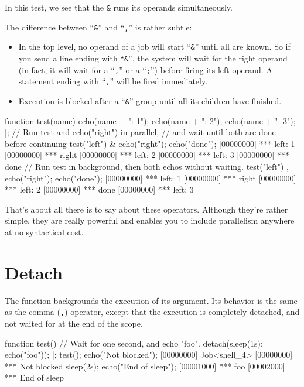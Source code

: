 In this test, we see that the \lstinline{&} runs its operands
simultaneously.

The difference between ``\lstinline{&}'' and ``\lstinline{,}'' is
rather subtle:

\begin{itemize}
\item In the top level, no operand of a job will start ``\lstinline{&}''
  until all are known.  So if you send a line ending with ``\lstinline{&}'',
  the system will wait for the right operand (in fact, it will wait for a
  ``\lstinline{,}'' or a ``\lstinline{;}'') before firing its left operand.
  A statement ending with ``\lstinline{,}'' will be fired immediately.
\item Execution is blocked after a ``\lstinline{&}'' group until all
  its children have finished.
\end{itemize}

\begin{urbiscript}[firstnumber=1]
function test(name)
{
  echo(name + ": 1");
  echo(name + ": 2");
  echo(name + ": 3");
}|;
// Run test and echo("right") in parallel,
// and wait until both are done before continuing
test("left") & echo("right"); echo("done");
[00000000] *** left: 1
[00000000] *** right
[00000000] *** left: 2
[00000000] *** left: 3
[00000000] *** done
// Run test in background, then both echos without waiting.
test("left") , echo("right"); echo("done");
[00000000] *** left: 1
[00000000] *** right
[00000000] *** left: 2
[00000000] *** done
[00000000] *** left: 3
\end{urbiscript}

That's about all there is to say about these operators. Although
they're rather simple, they are really powerful and enables you to
include parallelism anywhere at no syntactical cost.

\section{Detach}

The  function backgrounds the execution of
its argument. Its behavior is the same as the comma (\lstinline{,})
operator, except that the execution is completely detached, and not
waited for at the end of the scope.

\begin{urbiscript}[firstnumber=1]
function test()
{
  // Wait for one second, and echo "foo".
  detach({sleep(1s); echo("foo")});
}|;
test();
echo("Not blocked");
[00000000] Job<shell_4>
[00000000] *** Not blocked
sleep(2s);
echo("End of sleep");
[00001000] *** foo
[00002000] *** End of sleep
\end{urbiscript}


